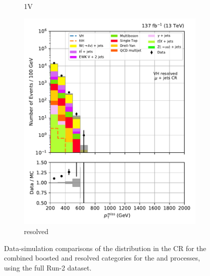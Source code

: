 \begin{figure}[htbp]
\begin{subfigure}[b]{0.24\textwidth}
        \caption{\VH 1V}
    \end{subfigure}
    \hfill
    \begin{subfigure}[b]{0.24\textwidth}
        \includegraphics[width=\textwidth]{figures/region_plots/full_Run2/region_1/VH_resolved.pdf}
        \caption{\VH resolved}
    \end{subfigure}
    \caption[Data-simulation comparisons of the \ptmiss distribution in the \singleMuCr control region for the combined boosted and resolved categories for the \ttH and \VH processes, using the full Run-2 dataset]{Data-simulation comparisons of the \ptmiss distribution in the \singleMuCr \gls{CR} for the combined boosted and resolved categories for the \ttH and \VH processes, using the full Run-2 dataset.}
    \label{fig:htoinv_cr_yields_comb2016to18_single_muon}
\end{figure}

